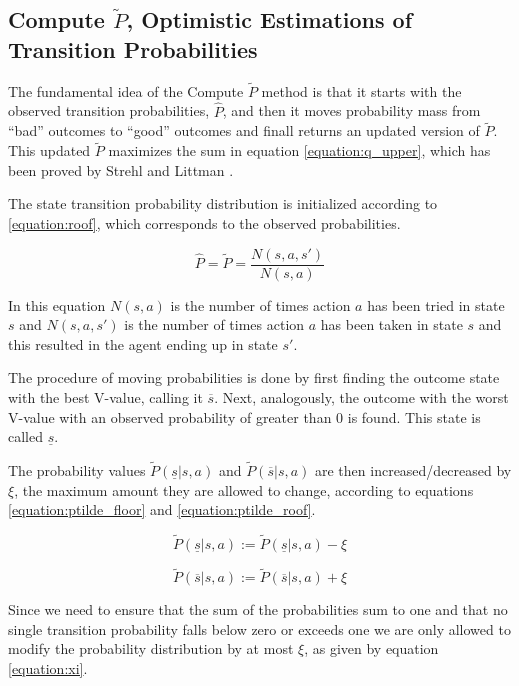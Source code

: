 \subsection{Compute $\tilde{P}$, Optimistic Estimations of Transition Probabilities}

The fundamental idea of the Compute $\tilde{P}$ method is that it starts with the observed transition probabilities, $\hat{P}$, and then it moves probability mass from ``bad'' outcomes to ``good'' outcomes and finall returns an updated version of $\tilde{P}$. This updated $\tilde{P}$ maximizes the sum in equation \ref{equation:q_upper}, which has been proved by Strehl and Littman \parencite{Strehl20081309}.

The state transition probability distribution is initialized according to \ref{equation:roof}, which corresponds to the observed probabilities.

\begin{equation}
\label{equation:roof}
\hat{P} = \tilde{P} = \frac{N(s,a,s')}{N(s,a)}
\end{equation}

In this equation $N(s, a)$ is the number of times action $a$ has been tried in state $s$ and $N(s, a, s')$ is the number of times action $a$ has been taken in state $s$ and this resulted in the agent ending up in state $s'$.

The procedure of moving probabilities is done by first finding the outcome state with the best V-value, calling it $\overline{s}$. Next, analogously, the outcome with the worst V-value with an observed probability of greater than 0 is found. This state is called $\underline{s}$. 

The probability values $\tilde{P}(\underline{s}|s,a)$ and $\tilde{P}(\overline{s}|s,a)$ are then increased/decreased by $\xi$, the maximum amount they are allowed to change, according to equations \eqref{equation:ptilde_floor} and \eqref{equation:ptilde_roof}.


\begin{equation}
\label{equation:ptilde_floor}
\tilde{P}(\underline{s}|s,a) := \tilde{P}(\underline{s}|s,a)-\xi
\end{equation}

\begin{equation}
\label{equation:ptilde_roof}
\tilde{P}(\overline{s}|s,a) := \tilde{P}(\overline{s}|s,a)+\xi
\end{equation}

Since we need to ensure that the sum of the probabilities sum to one and that no single transition probability falls below zero or exceeds one we are only allowed to modify the probability distribution by at most $\xi$, as given by equation \ref{equation:xi}. 

